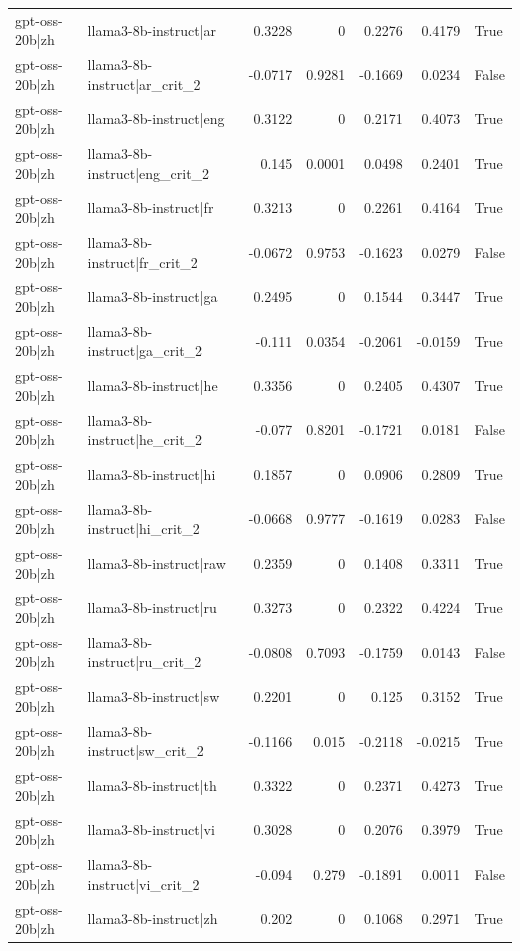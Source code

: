 \begin{table}
\begin{tabular}{l l r r r r l}
gpt-oss-20b|zh & llama3-8b-instruct|ar & 0.3228 & 0 & 0.2276 & 0.4179 & True \\
gpt-oss-20b|zh & llama3-8b-instruct|ar_crit_2 & -0.0717 & 0.9281 & -0.1669 & 0.0234 & False \\
gpt-oss-20b|zh & llama3-8b-instruct|eng & 0.3122 & 0 & 0.2171 & 0.4073 & True \\
gpt-oss-20b|zh & llama3-8b-instruct|eng_crit_2 & 0.145 & 0.0001 & 0.0498 & 0.2401 & True \\
gpt-oss-20b|zh & llama3-8b-instruct|fr & 0.3213 & 0 & 0.2261 & 0.4164 & True \\
gpt-oss-20b|zh & llama3-8b-instruct|fr_crit_2 & -0.0672 & 0.9753 & -0.1623 & 0.0279 & False \\
gpt-oss-20b|zh & llama3-8b-instruct|ga & 0.2495 & 0 & 0.1544 & 0.3447 & True \\
gpt-oss-20b|zh & llama3-8b-instruct|ga_crit_2 & -0.111 & 0.0354 & -0.2061 & -0.0159 & True \\
gpt-oss-20b|zh & llama3-8b-instruct|he & 0.3356 & 0 & 0.2405 & 0.4307 & True \\
gpt-oss-20b|zh & llama3-8b-instruct|he_crit_2 & -0.077 & 0.8201 & -0.1721 & 0.0181 & False \\
gpt-oss-20b|zh & llama3-8b-instruct|hi & 0.1857 & 0 & 0.0906 & 0.2809 & True \\
gpt-oss-20b|zh & llama3-8b-instruct|hi_crit_2 & -0.0668 & 0.9777 & -0.1619 & 0.0283 & False \\
gpt-oss-20b|zh & llama3-8b-instruct|raw & 0.2359 & 0 & 0.1408 & 0.3311 & True \\
gpt-oss-20b|zh & llama3-8b-instruct|ru & 0.3273 & 0 & 0.2322 & 0.4224 & True \\
gpt-oss-20b|zh & llama3-8b-instruct|ru_crit_2 & -0.0808 & 0.7093 & -0.1759 & 0.0143 & False \\
gpt-oss-20b|zh & llama3-8b-instruct|sw & 0.2201 & 0 & 0.125 & 0.3152 & True \\
gpt-oss-20b|zh & llama3-8b-instruct|sw_crit_2 & -0.1166 & 0.015 & -0.2118 & -0.0215 & True \\
gpt-oss-20b|zh & llama3-8b-instruct|th & 0.3322 & 0 & 0.2371 & 0.4273 & True \\
gpt-oss-20b|zh & llama3-8b-instruct|vi & 0.3028 & 0 & 0.2076 & 0.3979 & True \\
gpt-oss-20b|zh & llama3-8b-instruct|vi_crit_2 & -0.094 & 0.279 & -0.1891 & 0.0011 & False \\
gpt-oss-20b|zh & llama3-8b-instruct|zh & 0.202 & 0 & 0.1068 & 0.2971 & True \\

\end{tabular}
\end{table}
